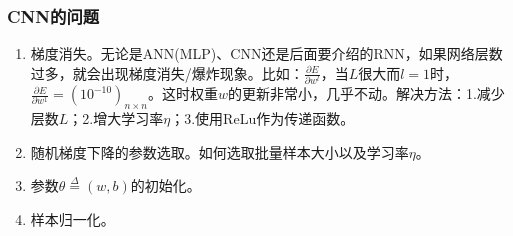         \subsubsection{CNN的问题}
            \par
            \begin{enumerate}
            \item 梯度消失。无论是ANN(MLP)、CNN还是后面要介绍的RNN，如果网络层数过多，就会出现梯度消失/爆炸现象。比如：$\frac{\partial E}{\partial w^l}$，当$L$很大而$l =1$时，$\frac{\partial E}{\partial w^1} = (10^{-10})_{n\times n}$。这时权重$w$的更新非常小，几乎不动。解决方法：1.减少层数$L$；2.增大学习率$\eta$；3.使用ReLu作为传递函数。
            \item 随机梯度下降的参数选取。如何选取批量样本大小以及学习率$\eta$。
            \item 参数$\theta \overset{\Delta }{=}(w,b)$的初始化。
            \item 样本归一化。
            \end{enumerate}

